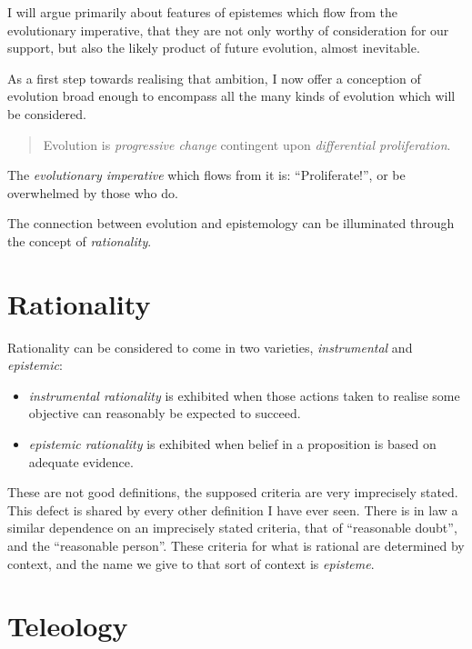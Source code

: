 I will argue primarily about features of epistemes which flow from the evolutionary imperative, that they are not only worthy of consideration for our support, but also the likely product of future evolution, almost inevitable.

As a first step towards realising that ambition, I now offer a conception of evolution broad enough to encompass all the many kinds of evolution which will be considered.

\begin{quote}
Evolution is \emph{progressive change} contingent upon \emph{differential proliferation}.
\end{quote}

The \emph{evolutionary imperative} which flows from it is: ``Proliferate!'', or be overwhelmed by those who do.

The connection between evolution and epistemology can be illuminated through the concept of \emph{rationality}.

\section{Rationality}

Rationality can be considered to come in two varieties, \emph{instrumental} and  \emph{epistemic}:

\begin{itemize}
\item[]\emph{instrumental rationality} is exhibited when those actions taken to realise some objective can reasonably be expected to succeed.
\item[]\emph{epistemic rationality} is exhibited when belief in a proposition is based on adequate evidence.
\end{itemize}

These are not good definitions, the supposed criteria are very imprecisely stated.
This defect is shared by every other definition I have ever seen.
There is in law a similar dependence on an imprecisely stated criteria, that of ``reasonable doubt'', and the ``reasonable person''.
These criteria for what is rational are determined by context, and the name we give to that sort of context is \emph{episteme}.

\section{Teleology}


